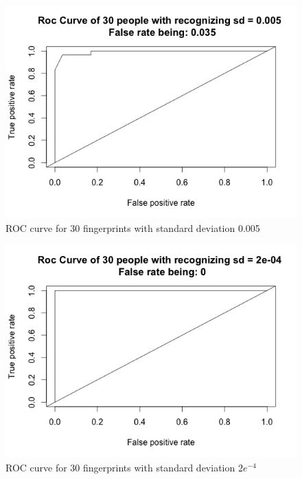 \documentclass[a4paper]{article}
\begin{document}
\begin{figure}
\centering
\includegraphics[width=13cm]{Roc2.png}
\caption{ROC curve for 30 fingerprints with standard deviation 0.005}
\label{fig:ROC2}
\end{figure}

\begin{figure}
\centering
\includegraphics[width=13cm]{Roc3.png}
\caption{ROC curve for 30 fingerprints with standard deviation $2e^{-4}$}
\label{fig:ROC3}
\end{figure}
\end{document}
